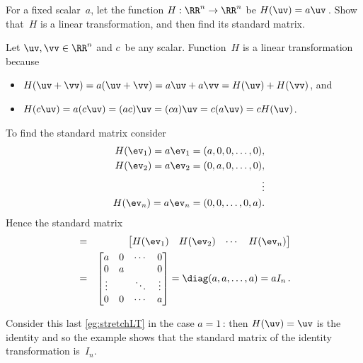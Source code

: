 \begin{example} \label{eg:stretchLT}
For a fixed scalar~\(a\), let the function \(H:\RR^n\to\RR^n\) be \(H(\uv)=a\uv\)\,.  Show that~\(H\) is a linear transformation, and then find its standard matrix.
\begin{solution} 
Let \(\uv,\vv\in\RR^n\) and \(c\)~be any scalar.
Function~\(H\) is a linear transformation because
\begin{itemize}
\item \(H(\uv+\vv)=a(\uv+\vv)=a\uv+a\vv=H(\uv)+H(\vv)\), and
\item \(H(c\uv)=a(c\uv)=(ac)\uv=(ca)\uv=c(a\uv)=cH(\uv)\).
\end{itemize}
To find the standard matrix consider
\begin{eqnarray*}
&&H(\ev_1)=a\ev_1=(a,0,0,\ldots,0),
\\&&H(\ev_2)=a\ev_2=(0,a,0,\ldots,0),
\\&&\qquad\vdots
\\&&H(\ev_n)=a\ev_n=(0,0,\ldots,0,a).
\end{eqnarray*}
Hence the standard matrix 
\begin{eqnarray*}
[H]&=&\begin{bmatrix} H(\ev_1)&H(\ev_2)&\cdots&H(\ev_n) \end{bmatrix}
\\&=&\begin{bmatrix} a&0&\cdots&0
\\0&a&&0
\\\vdots&&\ddots&\vdots
\\0&0&\cdots&a \end{bmatrix}
=\diag(a,a,\ldots,a)
=aI_n\,.
\end{eqnarray*}

\end{solution}
\end{example}

Consider this last \autoref{eg:stretchLT} in the case \(a=1\)\,: then \(H(\uv)=\uv\) is the identity and so the example shows that the standard matrix of the identity transformation is~\(I_n\).




